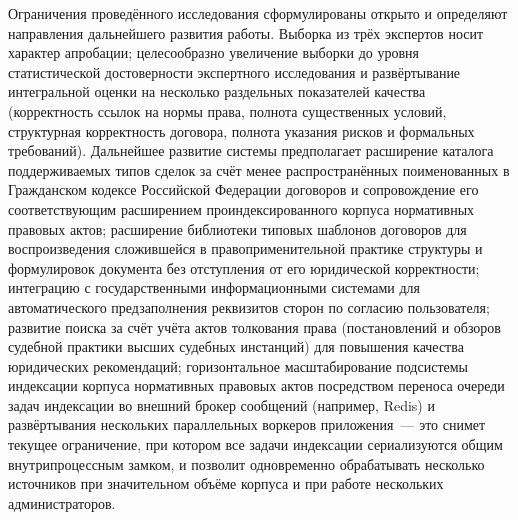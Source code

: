 Ограничения проведённого исследования сформулированы открыто и определяют направления дальнейшего развития работы. Выборка из трёх экспертов носит характер апробации; целесообразно увеличение выборки до уровня статистической достоверности экспертного исследования и развёртывание интегральной оценки на несколько раздельных показателей качества (корректность ссылок на нормы права, полнота существенных условий, структурная корректность договора, полнота указания рисков и формальных требований). Дальнейшее развитие системы предполагает расширение каталога поддерживаемых типов сделок за счёт менее распространённых поименованных в Гражданском кодексе Российской Федерации договоров и сопровождение его соответствующим расширением проиндексированного корпуса нормативных правовых актов; расширение библиотеки типовых шаблонов договоров для воспроизведения сложившейся в правоприменительной практике структуры и формулировок документа без отступления от его юридической корректности; интеграцию с государственными информационными системами для автоматического предзаполнения реквизитов сторон по согласию пользователя; развитие поиска за счёт учёта актов толкования права (постановлений и обзоров судебной практики высших судебных инстанций) для повышения качества юридических рекомендаций; горизонтальное масштабирование подсистемы индексации корпуса нормативных правовых актов посредством переноса очереди задач индексации во внешний брокер сообщений (например, Redis) и развёртывания нескольких параллельных воркеров приложения~--- это снимет текущее ограничение, при котором все задачи индексации сериализуются общим внутрипроцессным замком, и позволит одновременно обрабатывать несколько источников при значительном объёме корпуса и при работе нескольких администраторов.
